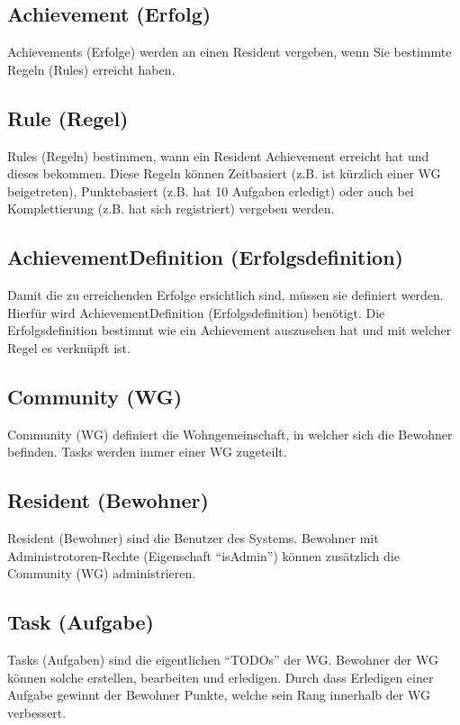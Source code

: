 \subsection*{Achievement (Erfolg)}
Achievements (Erfolge) werden an einen Resident vergeben, wenn Sie bestimmte Regeln (Rules) erreicht haben.

\subsection*{Rule (Regel)}
Rules (Regeln) bestimmen, wann ein Resident Achievement erreicht hat und dieses bekommen. Diese Regeln können Zeitbasiert (z.B. ist kürzlich einer \gls{WG} beigetreten), Punktebasiert (z.B. hat 10 Aufgaben erledigt) oder auch bei Komplettierung (z.B. hat sich registriert) vergeben werden.

\subsection*{AchievementDefinition (Erfolgsdefinition)}
Damit die zu erreichenden Erfolge ersichtlich sind, müssen sie definiert werden. Hierfür wird AchievementDefinition (Erfolgsdefinition) benötigt. Die Erfolgsdefinition bestimmt wie ein Achievement auszusehen hat und mit welcher Regel es verknüpft ist.

\subsection*{Community (\gls{WG})}
Community (WG) definiert die Wohngemeinschaft, in welcher sich die Bewohner befinden. Tasks werden immer einer WG zugeteilt.

\subsection*{Resident (Bewohner)}
Resident (Bewohner) sind die Benutzer des Systems. Bewohner mit Administrotoren-Rechte (Eigenschaft ``isAdmin'') können zusätzlich die Community (\gls{WG}) administrieren.

\subsection*{Task (Aufgabe)}
Tasks (Aufgaben) sind die eigentlichen ``TODOs'' der \gls{WG}. Bewohner der WG können solche erstellen, bearbeiten und erledigen. Durch dass Erledigen einer Aufgabe gewinnt der Bewohner Punkte, welche sein Rang innerhalb der WG verbessert.
